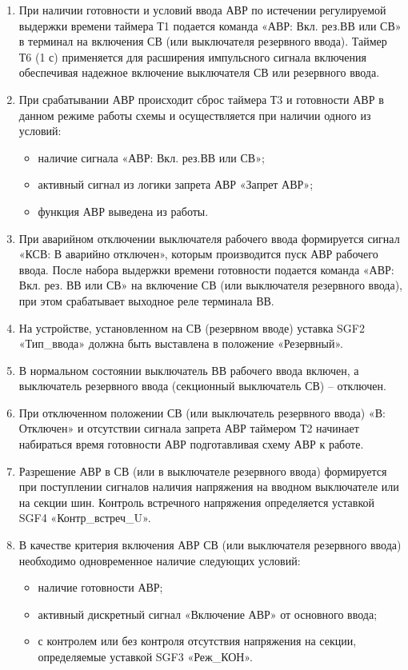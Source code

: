 \begin{enumerate}
\begin{enumerate}
\item
При наличии готовности и условий ввода АВР по истечении регулируемой выдержки времени таймера Т1 подается команда «АВР: Вкл. рез.ВВ или СВ» в терминал на включения СВ (или выключателя резервного ввода).  Таймер  Т6  (1 с)  применяется  для  расширения  импульсного  сигнала  включения  обеспечивая надежное включение выключателя СВ или резервного ввода. 

\item
При срабатывании АВР происходит сброс таймера Т3 и готовности АВР в данном режиме работы схемы и осуществляется при наличии одного из условий:
\begin{itemize}  
    \item наличие сигнала «АВР: Вкл. рез.ВВ или СВ»; 
    \item активный сигнал из логики запрета АВР «Запрет АВР»; 
    \item функция АВР выведена из работы.
\end{itemize}

\item
При аварийном отключении выключателя рабочего ввода формируется сигнал «КСВ: В аварийно отключен», которым производится пуск АВР рабочего ввода. После набора выдержки времени готовности подается команда «АВР: Вкл. рез. ВВ или СВ» на включение СВ (или выключателя резервного ввода), при этом срабатывает выходное реле терминала ВВ. 

\item
На устройстве, установленном на СВ (резервном вводе) уставка SGF2 «Тип\_ввода» должна быть выставлена в положение «Резервный». 

\item
В нормальном состоянии выключатель ВВ рабочего ввода включен, а выключатель резервного ввода (секционный выключатель СВ) -- отключен.

\item 
При отключенном положении СВ (или выключатель резервного ввода) «В: Отключен» и отсутствии сигнала запрета АВР таймером Т2 начинает набираться время готовности АВР подготавливая схему АВР к работе.

\item
Разрешение АВР в СВ (или в выключателе резервного ввода) формируется при поступлении сигналов наличия  напряжения  на  вводном  выключателе  или  на  секции  шин.  Контроль  встречного  напряжения определяется уставкой SGF4 «Контр\_встреч\_U».

\item
В  качестве  критерия  включения  АВР  СВ  (или  выключателя  резервного  ввода)  необходимо 
одновременное наличие следующих условий:
\begin{itemize} 
    \item наличие готовности АВР; 
    \item активный дискретный сигнал «Включение АВР» от основного ввода; 
    \item с контролем или без контроля отсутствия напряжения на секции, определяемые уставкой SGF3 «Реж\_КОН». 
\end{itemize}


\end{enumerate}
\end{enumerate}
